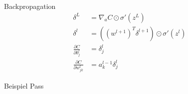 \begin{frame}{Backpropagation}
  \begin{align*}
    \delta^L &= \nabla_aC \odot \sigma' \left(z^L\right)\\[1em]
    \delta^l &= \left(\left(w^{l+1}\right)^T \delta^{l+1}\right) \odot
               \sigma'\left(z^l\right)\\[1em]
    \frac{\partial C}{\partial b^l_j} &= \delta^l_j\\[1em]
    \frac{\partial C}{\partial w^l_{jk}} &= a^{l-1}_k\delta^l_j
  \end{align*}
\end{frame}

\begin{frame}{Beispiel}
  Pass
\end{frame}

